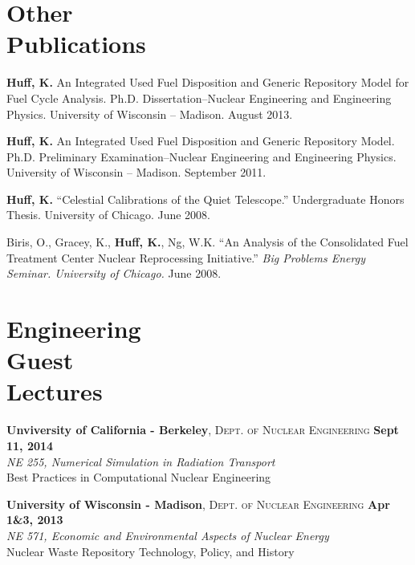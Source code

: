 \documentclass[margin,line]{resume}
\begin{document}
\begin{resume}
    \section{\mysidestyle Other\\Publications}
    \begin{bibenum}
      \item \textbf{Huff, K.} An Integrated Used Fuel Disposition and Generic Repository Model for Fuel Cycle Analysis. 
        Ph.D. Dissertation--Nuclear Engineering and Engineering 
        Physics. University of Wisconsin -- Madison.  August 2013. 
      \item \textbf{Huff, K.} An Integrated Used Fuel Disposition and Generic Repository Model. 
        Ph.D. Preliminary Examination--Nuclear Engineering and Engineering 
        Physics. University of Wisconsin -- Madison.  September 2011. 
      \item \textbf{Huff, K.} ``Celestial Calibrations of the Quiet Telescope.''
        Undergraduate Honors Thesis. University of Chicago. June 2008.
      \item Biris, O., Gracey, K., \textbf{Huff, K.}, Ng, W.K.  
        ``An Analysis of the Consolidated Fuel Treatment Center Nuclear 
        Reprocessing Initiative.''
        \emph{Big Problems Energy Seminar. University of Chicago.} June 2008.
    \end{bibenum}
    \pagebreak
    \section{\mysidestyle Engineering\\Guest\\Lectures}

    \textbf{Unviversity of California - Berkeley}, \textsc{Dept. of Nuclear Engineering} \hfill \textbf{Sept 11, 2014}\\ 
               \textsl{NE 255, Numerical Simulation in Radiation Transport}\\
               Best Practices in Computational Nuclear Engineering

    \textbf{University of Wisconsin - Madison}, \textsc{Dept. of Nuclear Engineering} \hfill \textbf{Apr 1\&3, 2013}\\ 
               \textsl{NE 571, Economic and Environmental Aspects of Nuclear Energy}\\
               Nuclear Waste Repository Technology, Policy, and History


\end{resume}
\end{document}
